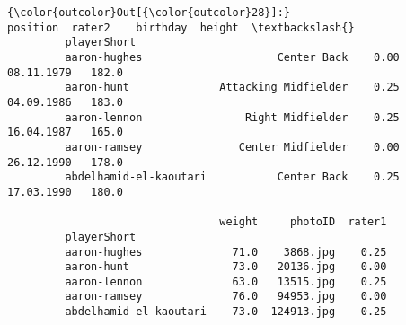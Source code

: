 \documentclass[11pt]{article}
\begin{document}
\begin{Verbatim}[commandchars=\\\{\}]
{\color{outcolor}Out[{\color{outcolor}28}]:}                                     position  rater2    birthday  height  \textbackslash{}
         playerShort                                                                
         aaron-hughes                     Center Back    0.00  08.11.1979   182.0   
         aaron-hunt              Attacking Midfielder    0.25  04.09.1986   183.0   
         aaron-lennon                Right Midfielder    0.25  16.04.1987   165.0   
         aaron-ramsey               Center Midfielder    0.00  26.12.1990   178.0   
         abdelhamid-el-kaoutari           Center Back    0.25  17.03.1990   180.0   
         
                                 weight     photoID  rater1  
         playerShort                                         
         aaron-hughes              71.0    3868.jpg    0.25  
         aaron-hunt                73.0   20136.jpg    0.00  
         aaron-lennon              63.0   13515.jpg    0.25  
         aaron-ramsey              76.0   94953.jpg    0.00  
         abdelhamid-el-kaoutari    73.0  124913.jpg    0.25  
\end{Verbatim}
            
\end{document}

